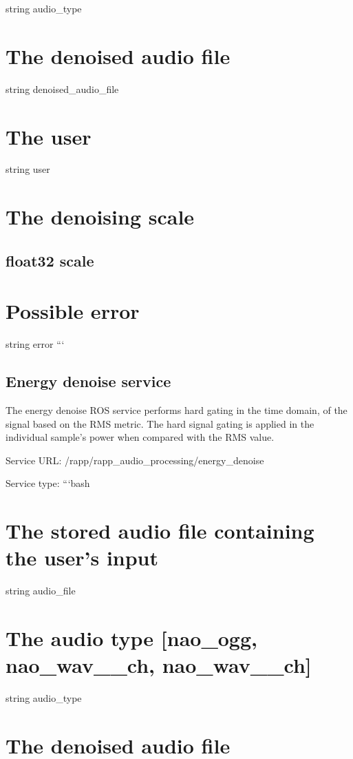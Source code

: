 string audio\-\_\-type \section*{The denoised audio file}

string denoised\-\_\-audio\-\_\-file \section*{The user}

string user \section*{The denoising scale}

\subsection*{float32 scale }

\section*{Possible error}

string error ```

\subsection*{Energy denoise service}

The energy denoise R\-O\-S service performs hard gating in the time domain, of the signal based on the R\-M\-S metric. The hard signal gating is applied in the individual sample’s power when compared with the R\-M\-S value.

Service U\-R\-L\-: {\ttfamily /rapp/rapp\-\_\-audio\-\_\-processing/energy\-\_\-denoise}

Service type\-: ```bash \section*{The stored audio file containing the user’s input}

string audio\-\_\-file \section*{The audio type \mbox{[}nao\-\_\-ogg, nao\-\_\-wav\-\_\-\_\-ch, nao\-\_\-wav\-\_\-\_\-ch\mbox{]}}

string audio\-\_\-type \section*{The denoised audio file}

